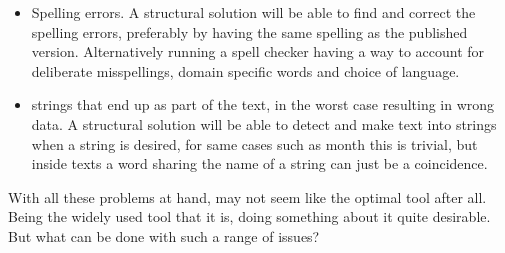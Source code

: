 \begin{itemize}
\item Spelling errors.  A structural solution will be able to find and
  correct the spelling errors, preferably by having the same spelling
  as the published version.  Alternatively running a spell checker
  having a way to account for deliberate misspellings, domain specific
  words and choice of language.

\item {\bibtex} strings that end up as part of the text, in the worst
  case resulting in wrong data.  A structural solution will be able to
  detect and make text into strings when a string is desired, for same
  cases such as month this is trivial, but inside texts a word sharing
  the name of a string can just be a coincidence.
\end{itemize}

With all these problems at hand, {\bibtex} may not seem like the
optimal tool after all.  Being the widely used tool that it is, doing
something about it quite desirable.  But what can be done with such a
range of issues?
